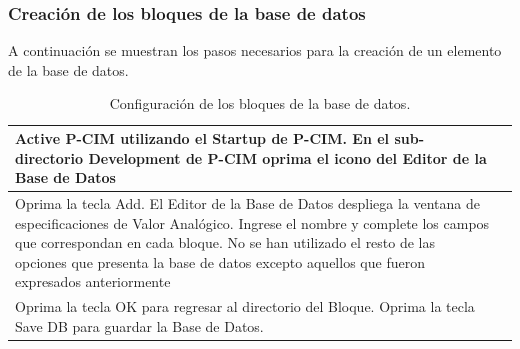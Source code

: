\subsubsection{Creación de los bloques de la base de datos}
A continuación se muestran los pasos necesarios para la creación de un elemento de la base de datos.
\begin{table}[H]
\centering
\renewcommand*{\arraystretch}{0.01}
\begin{tabular}{*{2}{m{}}}
\hline
  Active P-CIM utilizando el Startup de P-CIM. En el sub-directorio Development 
  de P-CIM oprima el icono del Editor de la Base de Datos
  &\begin{center}
    \rule{0.4\textwidth}{0.3\textwidth}
  \end{center}\\
\hline
  Oprima la tecla Add. El Editor de la Base de Datos despliega la ventana de
  especificaciones de Valor Analógico. Ingrese el nombre y complete los campos 
  que correspondan en cada bloque. No se han utilizado el resto de las opciones 
  que presenta la base de datos excepto aquellos que fueron expresados 
  anteriormente 
  &\begin{center}
    \rule{0.4\textwidth}{0.3\textwidth}
  \end{center}\\
\hline
    Oprima la tecla OK para regresar al directorio del Bloque.
    Oprima la tecla Save DB para guardar la Base de Datos.
  &\begin{center}
    \rule{0.4\textwidth}{0.3\textwidth}
  \end{center}\\
\hline
\end{tabular}
\label{tab:PropModbus}
\caption{Configuración de los bloques de la base de datos.}
\end{table}



